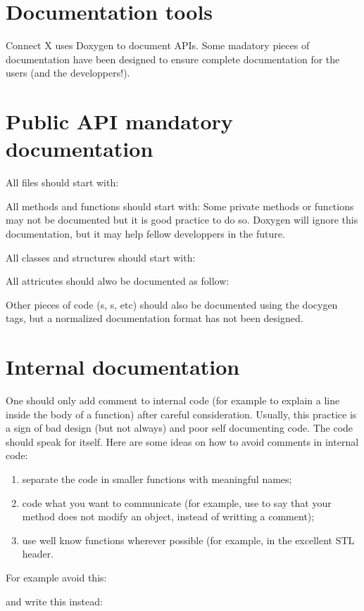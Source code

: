 \section{Documentation tools}
Connect X uses Doxygen to document APIs. Some madatory pieces of 
documentation have been designed to ensure complete documentation for the users 
(and the developpers!).

\section{Public API mandatory documentation}
All files should start with:

All methods and functions should start with:
Some private methods or functions may not be documented but it is good practice 
to do so. Doxygen will ignore this documentation, but it may help fellow 
developpers in the future.

All classes and structures should start with:

All attricutes should alwo be documented as follow:

Other pieces of code (s, s, etc) should also be 
documented using the docygen tags, but a normalized documentation format has not 
been designed.

\section{Internal documentation}
One should only add comment to internal code (for example to explain a line 
inside the body of a function) after careful consideration. Usually, this 
practice is a sign of bad design (but not always) and poor self documenting 
code. The code should speak for itself. Here are some ideas on how to avoid 
comments in internal code:

\begin{enumerate}

 \item separate the code in smaller functions with meaningful names;
 
 \item code what you want to communicate (for example, use  to say 
       that your method does not modify an object, instead of writting a 
       comment);
       
 \item use well know functions wherever possible (for example, in the excellent 
        STL header.
       
\end{enumerate}

For example avoid this:

and write this instead:

